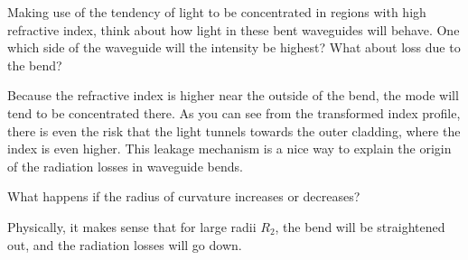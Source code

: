 \begin{cue}
Making use of the tendency of light to be concentrated in regions with high refractive index, think about how light in these bent waveguides will behave. One which side of the waveguide will the intensity be highest? What about loss due to the bend? 
\end{cue}

Because the refractive index is higher near the outside of the bend, the mode will tend to be concentrated there. As you can see from the transformed index profile, there is even the risk that the light tunnels towards the outer cladding, where the index is even higher. This leakage mechanism is a nice way to explain the origin of the radiation losses in waveguide bends. 

\begin{cue}
What happens if the radius of curvature increases or decreases?
\end{cue}    

Physically, it makes sense that for large radii $R_2$, the bend will be straightened out, and the radiation losses will go down.

